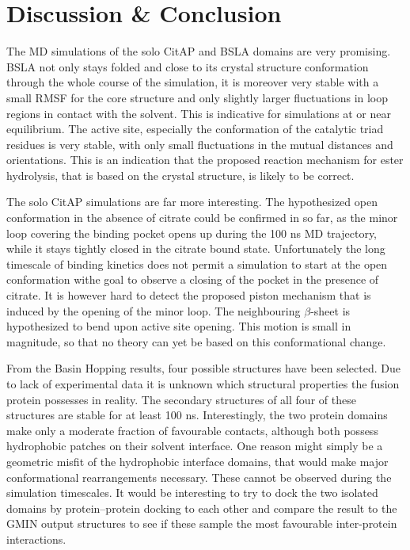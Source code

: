 \documentclass[english, a4paper, 12pt, titlepage, draft]{article}
\begin{document}

\section{Discussion \& Conclusion}

The MD simulations of the solo CitAP and BSLA domains are very promising.
BSLA not only stays folded and close to its crystal structure conformation through the whole course of the simulation, it is moreover very stable with a small RMSF for the core structure and only slightly larger fluctuations in loop regions in contact with the solvent.
This is indicative for simulations at or near equilibrium.
The active site, especially the conformation of the catalytic triad residues is very stable, with only small fluctuations in the mutual distances and orientations.
This is an indication that the proposed reaction mechanism for ester hydrolysis, that is based on the crystal structure, is likely to be correct.

The solo CitAP simulations are far more interesting.
The hypothesized open conformation in the absence of citrate could be confirmed in so far, as the minor loop covering the binding pocket opens up during the 100 ns MD trajectory, while it stays tightly closed in the citrate bound state.
Unfortunately the long timescale of binding kinetics does not permit a simulation to start at the open conformation withe goal to observe a closing of the pocket in the presence of citrate.
It is however hard to detect the proposed piston mechanism that is induced by the opening of the minor loop.
The neighbouring $\beta$-sheet is hypothesized to bend upon active site opening.
This motion is small in magnitude, so that no theory can yet be based on this conformational change.

From the Basin Hopping results, four possible structures have been selected.
Due to lack of experimental data it is unknown which structural properties the fusion protein possesses in reality.
The secondary structures of all four of these structures are stable for at least 100 ns.
Interestingly, the two protein domains make only a moderate fraction of favourable contacts, although both possess hydrophobic patches on their solvent interface.
One reason might simply be a geometric misfit of the hydrophobic interface domains, that would make major conformational rearrangements necessary.
These cannot be observed during the simulation timescales.
It would be interesting to try to dock the two isolated domains by protein--protein docking to each other and compare the result to the GMIN output structures to see if these sample the most favourable inter-protein interactions.
\end{document}
